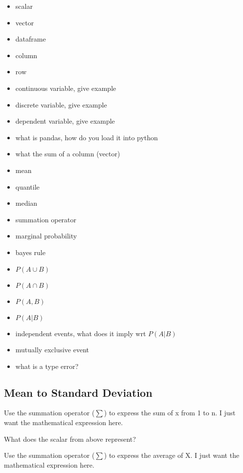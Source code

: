 \documentclass[11pt]{article}
\begin{document}
\begin{itemize}
  \item scalar
  \item vector 
  \item dataframe 
  \item column
  \item row
  \item continuous variable, give example 
  \item discrete variable, give example 
  \item dependent variable, give example 
  \item what is pandas, how do you load it into python
  \item what the sum of a column (vector)
  \item mean
  \item quantile
  \item median
  \item summation operator
  \item marginal probability 
  \item bayes rule
  \item $P(A \cup B)$
  \item $P(A \cap B)$
  \item $P(A , B)$
  \item $P(A | B)$
  \item independent events, what does it imply wrt $P(A | B)$
  \item mutually exclusive event
  \item what is a type error?
\end{itemize}


\subsection{ Mean to Standard Deviation }

Use the summation operator ($\sum$) to express the sum of x from 1 to n. I just want the mathematical expression here.
\newline 
\newline
\newline 


 What does the scalar from above represent? 
\newline 
\newline
\newline 

Use the summation operator ($\sum$) to express the average of X. I just want the mathematical expression here.
\newline 
\newline
\newline 
\end{document}
